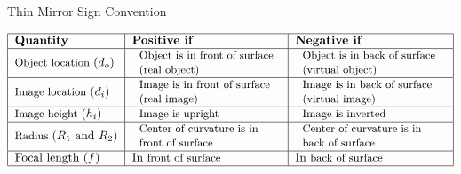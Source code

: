 \documentclass{article}
\begin{document}
Thin Mirror Sign Convention

\[
\begin{tabular}{|l|l|l|}
\hline
\textbf{Quantity} & \textbf{Positive if} & \textbf{Negative if} \\ \hline
{\small Object location }$\left( d_{o}\right) $ & 
\begin{tabular}{l}
{\small Object is in front of surface} \\ 
{\small (real object)}%
\end{tabular}
& 
\begin{tabular}{l}
{\small Object is in back of surface} \\ 
{\small (virtual object)}%
\end{tabular}%
{\small \ } \\ \hline
{\small Image location }$\left( d_{i}\right) $ & 
\begin{tabular}{l}
{\small Image is in front of surface } \\ 
{\small (real image)}%
\end{tabular}
& 
\begin{tabular}{l}
{\small Image is in back of surface} \\ 
{\small (virtual image)}%
\end{tabular}
\\ \hline
{\small Image height }$\left( h_{i}\right) $ & 
\begin{tabular}{l}
{\small Image is upright}%
\end{tabular}
& 
\begin{tabular}{l}
{\small Image is inverted}%
\end{tabular}
\\ \hline
{\small Radius }$\left( R_{1}\text{ and }R_{2}\right) $ & 
\begin{tabular}{l}
{\small Center of curvature is in} \\ 
{\small front of surface}%
\end{tabular}%
{\small \ } & 
\begin{tabular}{l}
{\small Center of curvature is in} \\ 
{\small back of surface}%
\end{tabular}%
{\small \ } \\ \hline
Focal length $\left( f\right) $ & In {\small front of surface} & In {\small %
back of surface} \\ \hline
\end{tabular}%
\]

\vspace{0.75in}
\end{document}
